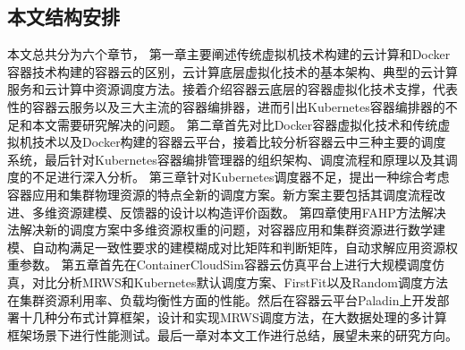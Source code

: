 \subsection{本文结构安排}
本文总共分为六个章节，
第一章主要阐述传统虚拟机技术构建的云计算和Docker容器技术构建的容器云的区别，云计算底层虚拟化技术的基本架构、典型的云计算服务和云计算中资源调度方法。接着介绍容器云底层的容器虚拟化技术支撑，代表性的容器云服务以及三大主流的容器编排器，进而引出Kubernetes容器编排器的不足和本文需要研究解决的问题。
第二章首先对比Docker容器虚拟化技术和传统虚拟机技术以及Docker构建的容器云平台，接着比较分析容器云中三种主要的调度系统，最后针对Kubernetes容器编排管理器的组织架构、调度流程和原理以及其调度的不足进行深入分析。
第三章针对Kubernetes调度器不足，提出一种综合考虑容器应用和集群物理资源的特点全新的调度方案。新方案主要包括其调度流程改进、多维资源建模、反馈器的设计以构造评价函数。
第四章使用FAHP方法解决法解决新的调度方案中多维资源权重的问题，对容器应用和集群资源进行数学建模、自动构满足一致性要求的建模糊成对比矩阵和判断矩阵，自动求解应用资源权重参数。
第五章首先在ContainerCloudSim容器云仿真平台上进行大规模调度仿真，对比分析MRWS和Kubernetes默认调度方案、FirstFit以及Random调度方法在集群资源利用率、负载均衡性方面的性能。然后在容器云平台Paladin上开发部署十几种分布式计算框架，设计和实现MRWS调度方法，在大数据处理的多计算框架场景下进行性能测试。最后一章对本文工作进行总结，展望未来的研究方向。

